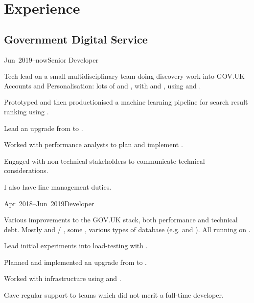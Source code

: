 \documentclass[a4paper]{barrucadu-cv}
\newcommand{\range}[2]{#1–#2}
\newcommand{\orange}[1]{\range{#1}{now}}
\begin{document}
\section{Experience}

\subsection{Government Digital Service}

\begin{cventry}{\orange{Jun~2019}}{Senior Developer}
  \begin{tightitemize}
  \item Tech lead on a small multidisciplinary  team
    doing discovery work into GOV.UK Accounts and Personalisation:
    lots of  and , with
     and , using  and .

  \item Prototyped and then productionised a machine learning pipeline
    for search result ranking using .

  \item Lead an upgrade from  to
    .

  \item Worked with performance analysts to plan and implement
    .

  \item Engaged with non-technical stakeholders to communicate
    technical considerations.

  \item I also have line management duties.
  \end{tightitemize}
\end{cventry}

\begin{cventry}{\range{Apr~2018}{Jun~2019}}{Developer}
  \begin{tightitemize}
  \item Various improvements to the GOV.UK stack, both performance and
    technical debt.  Mostly  and  /
    , some , various types of
    database (e.g.  and ).  All
    running on .

  \item Lead initial experiments into load-testing with
    .

  \item Planned and implemented an upgrade from  to .

  \item Worked with  infrastructure using
     and .

  \item Gave regular support to teams which did not merit a full-time
    developer.
  \end{tightitemize}
\end{cventry}
\end{document}
